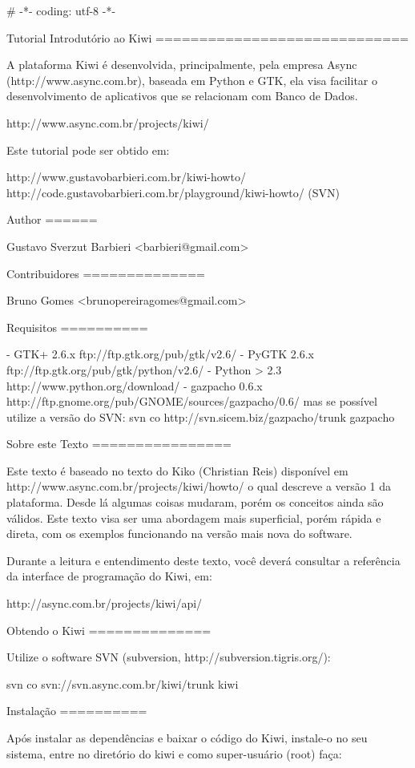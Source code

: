 # -*- coding: utf-8 -*-

Tutorial Introdutório ao Kiwi
=============================

A plataforma Kiwi é desenvolvida, principalmente, pela empresa Async
(http://www.async.com.br), baseada em Python e GTK, ela visa facilitar
o desenvolvimento de aplicativos que se relacionam com Banco de Dados.

   http://www.async.com.br/projects/kiwi/

Este tutorial pode ser obtido em:

   http://www.gustavobarbieri.com.br/kiwi-howto/
   http://code.gustavobarbieri.com.br/playground/kiwi-howto/ (SVN)


Author
======

   Gustavo Sverzut Barbieri <barbieri@gmail.com>


Contribuidores
==============

   Bruno Gomes <brunopereiragomes@gmail.com>


Requisitos
==========

    - GTK+ 2.6.x      ftp://ftp.gtk.org/pub/gtk/v2.6/
    - PyGTK 2.6.x     ftp://ftp.gtk.org/pub/gtk/python/v2.6/
    - Python > 2.3    http://www.python.org/download/
    - gazpacho 0.6.x  http://ftp.gnome.org/pub/GNOME/sources/gazpacho/0.6/
                      mas se possível utilize a versão do SVN:
                      svn co http://svn.sicem.biz/gazpacho/trunk gazpacho

Sobre este Texto
================

Este texto é baseado no texto do Kiko (Christian Reis) disponível em
http://www.async.com.br/projects/kiwi/howto/ o qual descreve a versão
1 da plataforma. Desde lá algumas coisas mudaram, porém os conceitos
ainda são válidos. Este texto visa ser uma abordagem mais superficial,
porém rápida e direta, com os exemplos funcionando na versão mais nova
do software.

Durante a leitura e entendimento deste texto, você deverá consultar a
referência da interface de programação do Kiwi, em:

   http://async.com.br/projects/kiwi/api/


Obtendo o Kiwi
==============

Utilize o software SVN (subversion, http://subversion.tigris.org/):

   svn co svn://svn.async.com.br/kiwi/trunk kiwi


Instalação
==========

Após instalar as dependências e baixar o código do Kiwi, instale-o no
seu sistema, entre no diretório do kiwi e como super-usuário (root)
faça:

